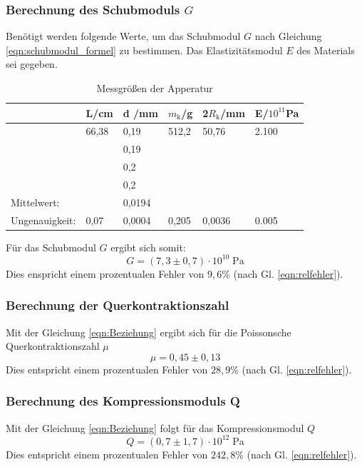 \newpage
\subsubsection{Berechnung des Schubmoduls $G$}
Benötigt werden folgende Werte, um das Schubmodul $G$ nach Gleichung \ref{eqn:schubmodul_formel}
zu bestimmen.
Das Elastizitätsmodul $E$ des Materials sei gegeben.
\begin{table}
    \centering
    \label{tab:tabelle_1}
    \begin{tabular}{p{3cm} | p{1.5cm} | p{1.5cm} | p{1.5cm} | p{1.5cm} |p{1.5cm}}
    \toprule
    & L\;/\;cm & d \;/\;mm & $m_\text{k}$\;/\;g & 2$R_\text{k}$\;/\;mm & E\;/\;$10^{11}$Pa\\
    \midrule
    &66,38 & 0,19 & 512,2 &  50,76  & 2.100\\
    &      & 0,19 &       &         &\\    
    &      & 0,2  &       &         &\\
    &      & 0,2  &       &         &\\
    \midrule
    Mittelwert:    &      & 0,0194 &       &        &\\
    Ungenauigkeit: & 0,07 & 0,0004 & 0,205 & 0,0036 & 0.005\\
    \bottomrule
    \end{tabular}
    \caption{Messgrößen der Apperatur}
    \label{tab:tabelle_2}
\end{table}

Für das Schubmodul $G$ ergibt sich somit:
\begin{equation*}
    G = (7,3 \pm 0,7 )\cdot 10^{10}\;\mathrm{Pa}
\end{equation*}
Dies enspricht einem prozentualen Fehler von $9,6\%$ (nach Gl. \ref{eqn:relfehler}).

\subsubsection{Berechnung der Querkontraktionszahl}
Mit der Gleichung \ref{eqn:Beziehung} ergibt sich für die Poissonsche Querkontraktionszahl $\mu$
\begin{equation*}
    \mu = 0,45 \pm 0,13 %
\end{equation*}
Dies entspricht einem prozentualen Fehler von $28,9\%$ (nach Gl. \ref{eqn:relfehler}).

\subsubsection{Berechnung des Kompressionsmoduls Q}
Mit der Gleichung \ref{eqn:Beziehung} 
folgt für das Kompressionsmodul $Q$
\begin{equation*}
    Q = (0,7 \pm 1,7) \cdot 10^{12} \;\mathrm{Pa}
\end{equation*}
Dies entspricht einem prozentualen Fehler von $242,8\%$ (nach Gl. \ref{eqn:relfehler}).\\

